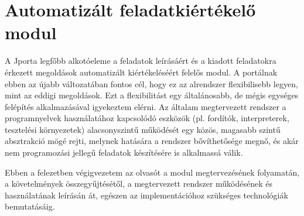\chapter{Automatizált feladatkiértékelő modul}\label{chapter:exercise}

A Jporta legfőbb alkotóeleme a feladatok leírásáért és a kiadott feladatokra érkezett megoldások automatizált kiértékeléséért felelős modul.
A portálnak ebben az újabb változatában fontos cél, hogy ez az alrendszer flexibilisebb legyen, mint az eddigi megoldások.
Ezt a flexibilitást egy általánosabb, de mégis egységes felépítés alkalmazásával igyekeztem elérni.
Az általam megtervezett rendszer a programnyelvek használatához kapcsolódó eszközök (pl. fordítók, interpreterek, tesztelési környezetek) alacsonyszintű működését egy közös, magasabb szintű absztrakció mögé rejti, melynek hatására a rendszer bővíthetősége megnő, és akár nem programozási jellegű feladatok készítésére is alkalmassá válik.

Ebben a felezetben végigvezetem az olvasót a modul megtervezésének folyamatán, a követelmények összegyűjtésétől, a megtervezett rendszer működésének és használatának leírásán át, egészen az implementációhoz szükséges technológiák bemutatásáig.


